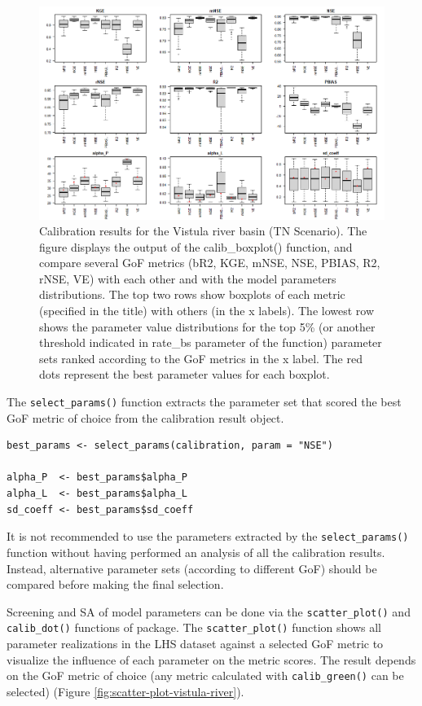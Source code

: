 \begin{figure}[H]
\includegraphics[width=1\linewidth,height=0.4\textheight]{figures/fig3} \caption{Calibration results for the Vistula river basin (TN Scenario). The figure displays the output of the calib\_boxplot() function, and compare several GoF metrics (bR2, KGE, mNSE, NSE, PBIAS, R2, rNSE, VE) with each other and with the model parameters distributions. The top two rows show boxplots of each metric (specified in the title) with others (in the x labels). The lowest row shows the parameter value distributions for the top 5\% (or another threshold indicated in rate\_bs parameter of the function) parameter sets ranked according to the GoF metrics in the x label. The red dots represent the best parameter values for each boxplot.}\label{fig:boxplot-vistula-river}
\end{figure}

\noindent The \texttt{select\_params()} function extracts the parameter set that scored the best GoF metric of choice from the calibration result object.

\begin{verbatim}
best_params <- select_params(calibration, param = "NSE")

alpha_P  <- best_params$alpha_P
alpha_L  <- best_params$alpha_L 
sd_coeff <- best_params$sd_coeff
\end{verbatim}

\noindent It is not recommended to use the parameters extracted by the \texttt{select\_params()} function without having performed an analysis of all the calibration results. Instead, alternative parameter sets (according to different GoF) should be compared before making the final selection.

Screening and SA of model parameters can be done via the \texttt{scatter\_plot()} and \texttt{calib\_dot()} functions of  package. The \texttt{scatter\_plot()} function shows all parameter realizations in the LHS dataset against a selected GoF metric to visualize the influence of each parameter on the metric scores. The result depends on the GoF metric of choice (any metric calculated with \texttt{calib\_green()} can be selected) (Figure \ref{fig:scatter-plot-vistula-river}).

